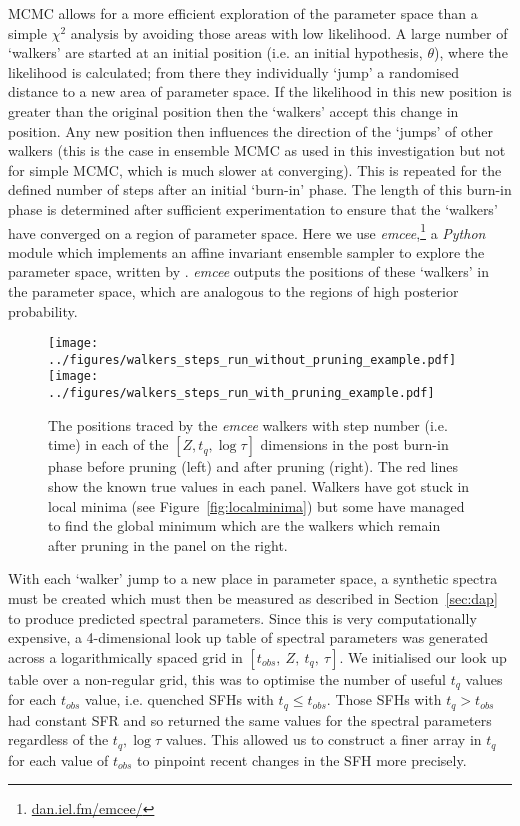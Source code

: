 \documentclass[useAMS,usenatbib]{mn2e}
\begin{document}
MCMC allows for a more efficient exploration of the parameter space than a simple $\chi^2$ analysis by avoiding those areas with low likelihood. A large number of `walkers' are started at an initial position (i.e. an initial hypothesis, $\theta$), where the likelihood is calculated; from there they individually `jump' a randomised distance to a new area of parameter space. If the likelihood in this new position is greater than the original position then the `walkers' accept this change in position. Any new position then influences the direction of the  `jumps' of other walkers (this is the case in ensemble MCMC as used in this investigation but not for simple MCMC, which is much slower at converging). This is repeated for the defined number of steps after an initial `burn-in' phase. The length of this burn-in phase is determined after sufficient experimentation to ensure that the `walkers' have converged on a region of parameter space. Here we use \emph{emcee},\footnote{\url{dan.iel.fm/emcee/}} a \emph{Python} module which implements an affine invariant ensemble sampler to explore the parameter space, written by \cite{emcee13}. \emph{emcee} outputs the positions of these `walkers' in the parameter space, which are analogous to the regions of high posterior probability. 

\begin{figure*}
\centering
\texttt{[image: ../figures/walkers\_steps\_run\_without\_pruning\_example.pdf]}
\texttt{[image: ../figures/walkers\_steps\_run\_with\_pruning\_example.pdf]}
\caption{The positions traced by the \emph{emcee} walkers with step number (i.e. time) in each of the $[Z, t_q, \log \tau]$ dimensions in the post burn-in phase before pruning (left) and after pruning (right). The red lines show the known true values in each panel. Walkers have got stuck in local minima (see Figure~\ref{fig:localminima}) but some have managed to find the global minimum which are the walkers which remain after pruning in the panel on the right.}
\label{fig:comparepruning}
\end{figure*}

With each `walker' jump to a new place in parameter space, a synthetic spectra must be created which must then be measured as described in Section~\ref{sec:dap} to produce predicted spectral parameters. Since this is very computationally expensive, a 4-dimensional look up table of spectral parameters was generated across a logarithmically spaced grid in $[t_{obs},~Z,~t_q,~\tau]$. We initialised our look up table over a non-regular grid, this was to optimise the number of useful $t_q$ values for each $t_{obs}$ value, i.e. quenched SFHs with $t_q \leq t_{obs}$. Those SFHs with $t_q > t_{obs}$ had constant SFR and so returned the same values for the spectral parameters regardless of the $t_q, \log\tau$ values. This allowed us to construct a finer array in $t_q$ for each value of $t_{obs}$ to pinpoint recent changes in the SFH more precisely. 
\end{document}
